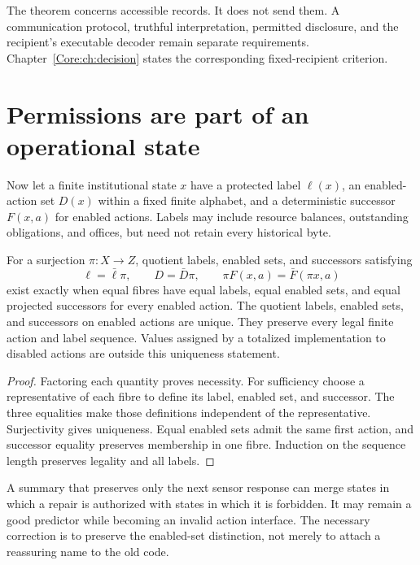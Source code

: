 The theorem concerns accessible records. It does not send them. A communication protocol, truthful interpretation, permitted disclosure, and the recipient's executable decoder remain separate requirements. Chapter~\ref{Core:ch:decision} states the corresponding fixed-recipient criterion.

\section{Permissions are part of an operational state}
Now let a finite institutional state $x$ have a protected label $\ell(x)$, an enabled-action set $D(x)$ within a fixed finite alphabet, and a deterministic successor $F(x,a)$ for enabled actions. Labels may include resource balances, outstanding obligations, and offices, but need not retain every historical byte.

\begin{Coretheorem}\label{Core:r:governance}
For a surjection $\pi:X\to Z$, quotient labels, enabled sets, and successors satisfying
\[
\ell=\bar\ell\pi,\qquad D=\bar D\pi,\qquad
\pi F(x,a)=\bar F(\pi x,a)
\]
exist exactly when equal fibres have equal labels, equal enabled sets, and equal projected successors for every enabled action. The quotient labels, enabled sets, and successors on enabled actions are unique. They preserve every legal finite action and label sequence. Values assigned by a totalized implementation to disabled actions are outside this uniqueness statement.
\end{Coretheorem}
\begin{proof}
Factoring each quantity proves necessity. For sufficiency choose a representative of each fibre to define its label, enabled set, and successor. The three equalities make those definitions independent of the representative. Surjectivity gives uniqueness. Equal enabled sets admit the same first action, and successor equality preserves membership in one fibre. Induction on the sequence length preserves legality and all labels.
\end{proof}

A summary that preserves only the next sensor response can merge states in which a repair is authorized with states in which it is forbidden. It may remain a good predictor while becoming an invalid action interface. The necessary correction is to preserve the enabled-set distinction, not merely to attach a reassuring name to the old code.

